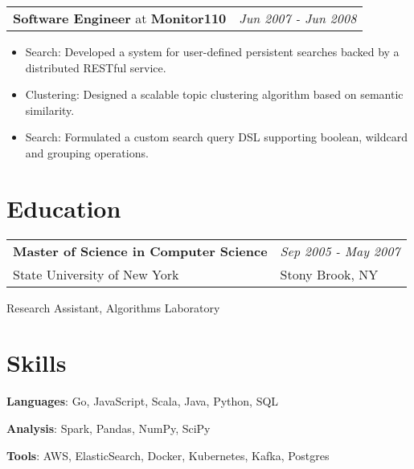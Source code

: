 \documentclass[9pt,twoside,letterpaper,hidelinks]{article}
\newcommand{\resumeItem}[2]{
  \item{
    {#1}{: #2 }
  }
}
\newcommand{\resumeSubheading}[4]{
        \newcolumntype{R}{>{\raggedleft\arraybackslash}X}%
    \begin{tabularx}{\textwidth}{XR}
      \textbf{#3} at \textbf{#1} & \textit{\small #4}
    \end{tabularx}
}
\newcommand{\resumeItemListStart}{
  \begin{itemize}[noitemsep,topsep=0pt]
}
\newcommand{\resumeItemListEnd}{
  \end{itemize}
}
\begin{document}
    \resumeSubheading
      {Monitor110}{New York, NY}{Software Engineer}{Jun 2007 - Jun 2008}
      \resumeItemListStart
        \resumeItem{Search}
          {Developed a system for user-defined persistent searches backed by a distributed RESTful service.}
        \resumeItem{Clustering}
          {Designed a scalable topic clustering algorithm based on semantic similarity.}
        \resumeItem{Search}
          {Formulated a custom search query DSL supporting boolean, wildcard and grouping operations.}
      \resumeItemListEnd

\section{Education}
\resumeSubHeadingListStart
\item {
    \begin{tabularx}{0.97\textwidth}{XR}
      \textbf{Master of Science in Computer Science} & \textit{\small Sep 2005 - May 2007} \\
      State University of New York & Stony Brook, NY  \\
    \end{tabularx}
}
\begin{minipage}{\textwidth}
\vspace{0.25em}
Research Assistant, Algorithms Laboratory
\end{minipage}
\resumeSubHeadingListEnd

\section{Skills}
  \resumeSubHeadingListStart
    \item{
      \textbf{Languages}{: Go, JavaScript, Scala, Java, Python, SQL }
         }
    \item {
      \textbf{Analysis}{: Spark, Pandas, NumPy, SciPy}
    }
    \item {
      \textbf{Tools}{: AWS, ElasticSearch, Docker, Kubernetes, Kafka, Postgres }
    }
  \resumeSubHeadingListEnd

\end{document}
